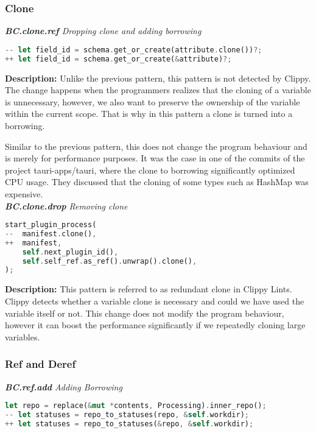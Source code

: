 \subsubsection{Clone}

\noindent \textit{ \textbf{BC.clone.ref} Dropping clone and adding borrowing}

\begin{lstlisting}[language=Rust, style=colouredRust]
-- let field_id = schema.get_or_create(attribute.clone())?;
++ let field_id = schema.get_or_create(&attribute)?;
\end{lstlisting}

\noindent \textbf{Description:} Unlike the previous pattern, this pattern is not detected by Clippy. The change happens when the programmers realizes that the cloning of a variable is unnecessary, however, we also want to preserve the ownership of the variable within the current scope. That is why in this pattern a clone is turned into a borrowing. 

Similar to the previous pattern, this does not change the program behaviour and is merely for performance purposes. It was the case in one of the commits of the project tauri-apps/tauri, where the clone to borrowing significantly optimized CPU usage. They discussed that the cloning of some types such as HashMap was expensive. \\

\noindent \textit{ \textbf{BC.clone.drop} Removing clone}

\begin{lstlisting}[language=Rust, style=colouredRust]
start_plugin_process(
--  manifest.clone(),
++  manifest,
    self.next_plugin_id(),
    self.self_ref.as_ref().unwrap().clone(),
);
\end{lstlisting}

\noindent \textbf{Description:} This pattern is referred to as redundant clone in Clippy Lints. Clippy detects whether a variable clone is necessary and could we have used the variable itself or not. This change does not modify the program behaviour, however it can boost the performance significantly if we repeatedly cloning large variables. 

\subsubsection{Ref and Deref}

\noindent \textit{ \textbf{BC.ref.add} Adding Borrowing}

\begin{lstlisting}[language=Rust, style=colouredRust]
let repo = replace(&mut *contents, Processing).inner_repo();
-- let statuses = repo_to_statuses(repo, &self.workdir);
++ let statuses = repo_to_statuses(&repo, &self.workdir);
\end{lstlisting}

